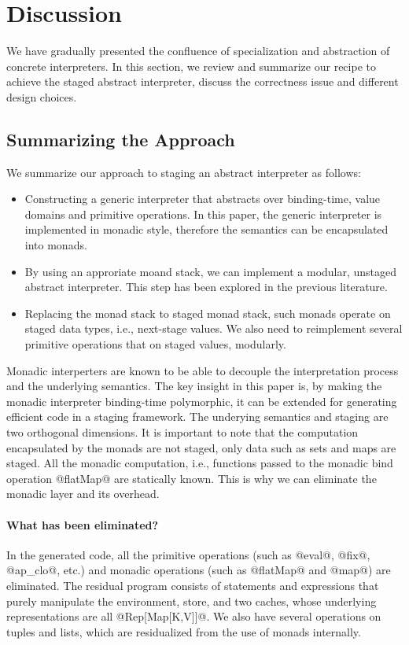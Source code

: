 \section{Discussion}

We have gradually presented the confluence of specialization and abstraction of
concrete interpreters. In this section, we review and summarize our recipe
to achieve the staged abstract interpreter, discuss the correctness issue
and different design choices.

\subsection{Summarizing the Approach}

We summarize our approach to staging an abstract interpreter as follows:

\begin{itemize}
  \item Constructing a generic interpreter that abstracts over binding-time,
    value domains and primitive operations. In this paper, the generic interpreter
    is implemented in monadic style, therefore the semantics can be encapsulated
    into monads.
  \item By using an approriate moand stack, we can implement a modular, unstaged
    abstract interpreter. This step has been explored in the previous literature.
  \item Replacing the monad stack to staged monad stack, such monads operate on
    staged data types, i.e., next-stage values. We also need to reimplement several
    primitive operations that on staged values, modularly.
\end{itemize}

Monadic interperters are known to be able to decouple the interpretation process
and the underlying semantics. The key insight in this paper is, by making the
monadic interpreter binding-time polymorphic, it can be extended for generating
efficient code in a staging framework. The underying semantics and staging are
two orthogonal dimensions. It is important to note that the computation
encapsulated by the monads are not staged, only data such as sets and maps are
staged. All the monadic computation, i.e., functions passed to the monadic bind
operation @flatMap@ are statically known. This is why we can eliminate the
monadic layer and its overhead.

\paragraph{What has been eliminated?} In the generated code, all the
primitive operations (such as @eval@, @fix@, @ap_clo@, etc.) and monadic
operations (such as @flatMap@ and @map@) are eliminated. The residual program
consists of statements and expressions that purely manipulate the environment,
store, and two caches, whose underlying representations are all @Rep[Map[K,V]]@. We
also have several operations on tuples and lists, which are residualized from
the use of monads internally.

